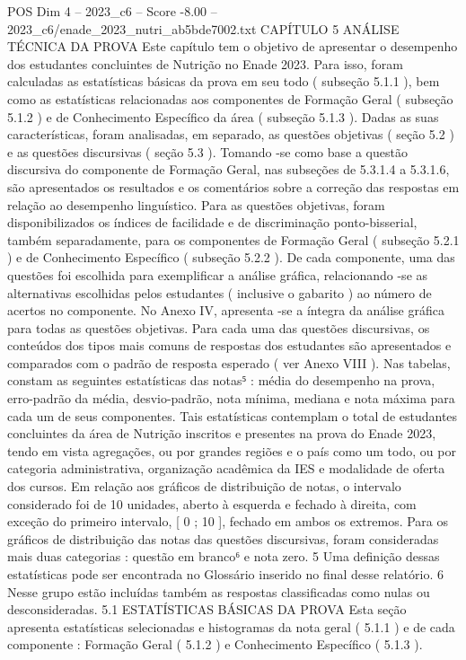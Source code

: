 \begin{textsample}{POS Dim 4 – 2023\_c6 – Score -8.00 – 2023\_c6/enade\_2023\_nutri\_ab5bde7002.txt}  \label{ex:f4_pos_345}
CAPÍTULO 5 ANÁLISE TÉCNICA DA PROVA Este capítulo tem o objetivo de apresentar o desempenho dos estudantes concluintes de Nutrição no Enade 2023.
Para isso, foram calculadas as estatísticas básicas da prova em seu todo ( subseção 5.1.1 ), bem como as estatísticas relacionadas aos componentes de Formação Geral ( subseção 5.1.2 ) e de Conhecimento Específico da área ( subseção 5.1.3 ).
Dadas as suas características, foram analisadas, em separado, as questões objetivas ( seção 5.2 ) e as questões discursivas ( seção 5.3 ).
Tomando -se como base a questão discursiva do componente de Formação Geral, nas subseções de 5.3.1.4 a 5.3.1.6, são apresentados os resultados e os comentários sobre a correção das respostas em relação ao desempenho linguístico.
Para as questões objetivas, foram disponibilizados os índices de facilidade e de discriminação ponto-bisserial, também separadamente, para os componentes de Formação Geral ( subseção 5.2.1 ) e de Conhecimento Específico ( subseção 5.2.2 ).
De cada componente, uma das questões foi escolhida para exemplificar a análise gráfica, relacionando -se as alternativas escolhidas pelos estudantes ( inclusive o gabarito ) ao número de acertos no componente.
No Anexo IV, apresenta -se a íntegra da análise gráfica para todas as questões objetivas.
Para cada uma das questões discursivas, os conteúdos dos tipos mais comuns de respostas dos estudantes são apresentados e comparados com o padrão de resposta esperado ( ver Anexo VIII ).
Nas tabelas, constam as seguintes estatísticas das notas⁵ : média do desempenho na prova, erro-padrão da média, desvio-padrão, nota mínima, mediana e nota máxima para cada um de seus componentes.
Tais estatísticas contemplam o total de estudantes concluintes da área de Nutrição inscritos e presentes na prova do Enade 2023, tendo em vista agregações, ou por grandes regiões e o país como um todo, ou por categoria administrativa, organização acadêmica da IES e modalidade de oferta dos cursos.
Em relação aos gráficos de distribuição de notas, o intervalo considerado foi de 10 unidades, aberto à esquerda e fechado à direita, com exceção do primeiro intervalo, [ 0 ; 10 ], fechado em ambos os extremos.
Para os gráficos de distribuição das notas das questões discursivas, foram consideradas mais duas categorias : questão em branco⁶ e nota zero. 5 Uma definição dessas estatísticas pode ser encontrada no Glossário inserido no final desse relatório. 6 Nesse grupo estão incluídas também as respostas classificadas como nulas ou desconsideradas. 5.1 ESTATÍSTICAS BÁSICAS DA PROVA Esta seção apresenta estatísticas selecionadas e histogramas da nota geral ( 5.1.1 ) e de cada componente : Formação Geral ( 5.1.2 ) e Conhecimento Específico ( 5.1.3 ).

\end{textsample}
